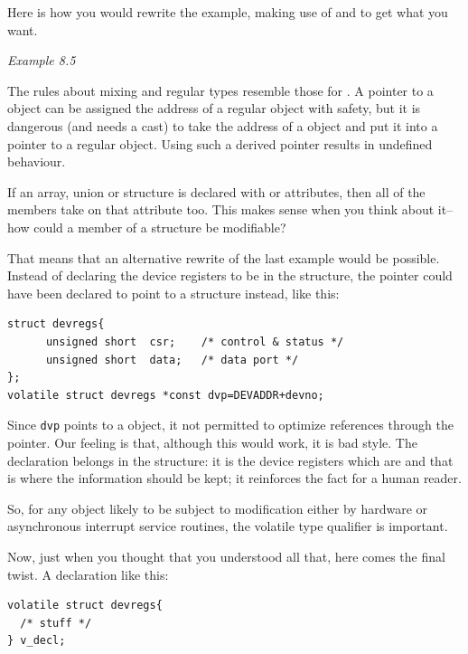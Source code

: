    Here is how you would rewrite the example, making use of
    \const{} and \volatile{} to get what you want.


    \begin{center}\textit{Example 8.5}\end{center}


   The rules about mixing \volatile{} and regular types
    resemble those for \const. A pointer to
    a \volatile{} object can be assigned the address of a regular
    object with safety, but it is dangerous (and needs a cast) to take the
    address of a \volatile{} object and put it into a pointer to
    a regular object. Using such a derived pointer results in undefined
    behaviour.


   If an array, union or structure is declared with \const{} or
    \volatile{} attributes, then all of the members take on that
    attribute too. This makes sense when you think about it--how could
    a member of a \const{} structure be modifiable?


   That means that an alternative rewrite of the last example would be
    possible. Instead of declaring the device registers to be
    \volatile{} in the structure, the pointer could have been
    declared to point to a \volatile{} structure instead, like
    this:


\begin{Verbatim}
struct devregs{
      unsigned short  csr;    /* control & status */
      unsigned short  data;   /* data port */
};
volatile struct devregs *const dvp=DEVADDR+devno;
\end{Verbatim}

   Since \texttt{dvp} points to a \volatile{} object, it
    not permitted to optimize references through the pointer. Our feeling is
    that, although this would work, it is bad style. The
    \volatile{} declaration belongs in the structure: it is the
    device registers which are \volatile{} and that is where the
    information should be kept; it reinforces the fact for a human
    reader.


   So, for any object likely to be subject to modification either by
    hardware or asynchronous interrupt service routines, the volatile type
    qualifier is important.


   Now, just when you thought that you understood all that, here comes
    the final twist. A declaration like this:


\begin{Verbatim}
volatile struct devregs{
  /* stuff */
} v_decl;
\end{Verbatim}

